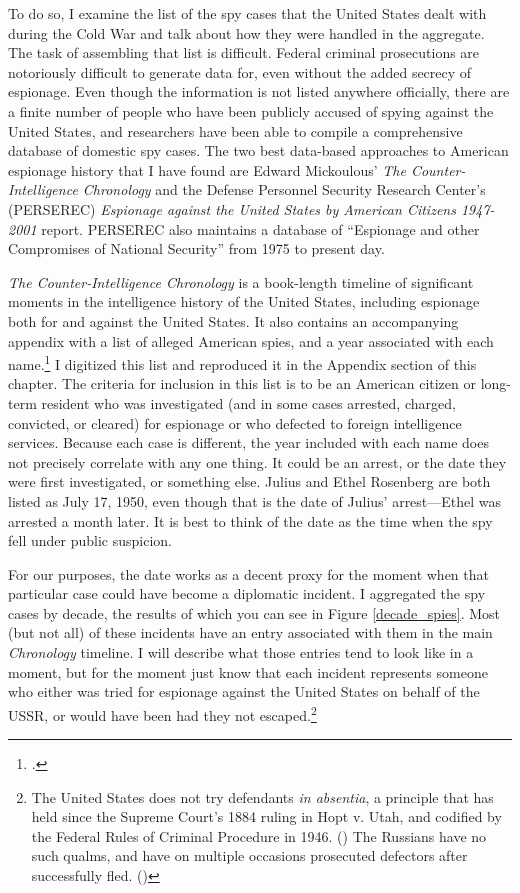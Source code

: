 \documentclass[11pt]{memoir}
\begin{document}
\begin{refsegment}
To do so, I examine the list of the spy cases that the United States dealt with during the Cold War and talk about how they were handled in the aggregate. The task of assembling that list is difficult. Federal criminal prosecutions are notoriously difficult to generate data for, even without the added secrecy of espionage. Even though the information is not listed anywhere officially, there are a finite number of people who have been publicly accused of spying against the United States, and researchers have been able to compile a comprehensive database of domestic spy cases. The two best data-based approaches to American espionage history that I have found are Edward Mickoulous' \emph{The Counter-Intelligence Chronology} and the Defense Personnel Security Research Center's (PERSEREC) \emph{Espionage against the United States by American Citizens 1947-2001} report. PERSEREC also maintains a database of ``Espionage and other Compromises of National Security'' from 1975 to present day.

\emph{The Counter-Intelligence Chronology} is a book-length timeline of significant moments in the intelligence history of the United States, including espionage both for and against the United States. It also contains an accompanying appendix with a list of alleged American spies, and a year associated with each name.\footcite[p.~173]{mickolus_counterintelligence_2015} I digitized this list and reproduced it in the Appendix section of this chapter. The criteria for inclusion in this list is to be an American citizen or long-term resident who was investigated (and in some cases arrested, charged, convicted, or cleared) for espionage or who defected to foreign intelligence services. Because each case is different, the year included with each name does not precisely correlate with any one thing. It could be an arrest, or the date they were first investigated, or something else. Julius and Ethel Rosenberg are both listed as July 17, 1950, even though that is the date of Julius' arrest---Ethel was arrested a month later. It is best to think of the date as the time when the spy fell under public suspicion.

For our purposes, the date works as a decent proxy for the moment when that particular case could have become a diplomatic incident. I aggregated the spy cases by decade, the results of which you can see in Figure \ref{decade_spies}. Most (but not all) of these incidents have an entry associated with them in the main \emph{Chronology} timeline. I will describe what those entries tend to look like in a moment, but for the moment just know that each incident represents someone who either was tried for espionage against the United States on behalf of the USSR, or would have been had they not escaped.\footnote{The United States does not try defendants \emph{in absentia}, a principle that has held since the Supreme Court's 1884 ruling in Hopt v. Utah, and codified by the Federal Rules of Criminal Procedure in 1946. (\cite{noauthor_rule_1946-1}) The Russians have no such qualms, and have on multiple occasions prosecuted defectors after successfully fled. (\cite{traynor_trial_2002})}


\end{refsegment}
\end{document}
